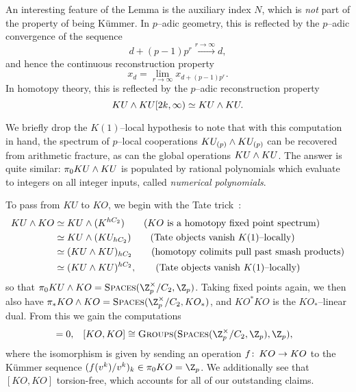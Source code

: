 \begin{remark}
An interesting feature of the Lemma is the auxiliary index \(N\), which is \emph{not} part of the property of being K\"ummer.  In \(p\)--adic geometry, this is reflected by the \(p\)--adic convergence of the sequence \[d + (p-1)p^r \xrightarrow{r \to \infty} d,\] and hence the continuous reconstruction property \[x_d = \lim_{r \to \infty} x_{d + (p-1)p^r}.\]  In homotopy theory, this is reflected by the \(p\)--adic reconstruction property \[KU \wedge KU[2k, \infty) \simeq KU \wedge KU.\]
\end{remark}

\begin{remark}
We briefly drop the \(K(1)\)--local hypothesis to note that with this computation in hand, the spectrum of \(p\)--local cooperations \(KU_{(p)} \wedge KU_{(p)}\) can be recovered from arithmetic fracture, as can the global operations \(KU \wedge KU\).  The answer is quite similar: \(\pi_0 KU \wedge KU\) is populated by rational polynomials which evaluate to integers on all integer inputs, called \textit{numerical polynomials}.
\end{remark}

To pass from \(KU\) to \(KO\), we begin with the Tate trick~\cite{ClausenMathew,GreenleesSadofsky,HoveySadofsky}:
\begin{align*}
KU \wedge KO & \simeq KU \wedge (K^{hC_2}) \tag{\(KO\) is a homotopy fixed point spectrum} \\
& \simeq KU \wedge (KU_{hC_2}) \tag{Tate objects vanish \(K(1)\)--locally} \\
& \simeq (KU \wedge KU)_{hC_2} \tag{homotopy colimits pull past smash products} \\
& \simeq (KU \wedge KU)^{hC_2}, \tag{Tate objects vanish \(K(1)\)--locally}
\end{align*}
so that \(\pi_0 KU \sm KO = \CatOf{Spaces}(\Z_p^\times / C_2, \Z_p)\).  Taking fixed points again, we then also have \(\pi_* KO \sm KO = \CatOf{Spaces}(\Z_p^\times / C_2, KO_*)\), and \(KO^* KO\) is the \(KO_*\)--linear dual.  From this we gain the computations
\begin{align*}
[\Susp^{-1} KO, KO] & = 0, &
[KO, KO] & \cong \CatOf{Groups}(\CatOf{Spaces}(\Z_p^\times / C_2, \Z_p), \Z_p),
\end{align*}
where the isomorphism is given by sending an operation $f\colon\thinspace KO \to KO$ to the K\"ummer sequence $(f(v^k)/v^k)_k \in \pi_0 KO = \Z_p$.  We additionally see that \([KO, KO]\) torsion-free, which accounts for all of our outstanding claims.


